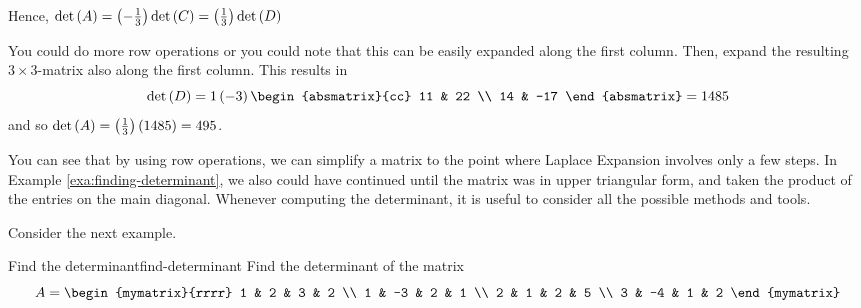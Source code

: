 \begin{solution}
Hence, $\det \left(A\right) = \left(-\frac{1}{3}\right) \det \left(C\right) = \left(\frac{1}{3}\right) \det \left(D\right)$ 

You could do more row operations or you could note that this can be easily
expanded along the first column. Then, expand the resulting $3 \times 3$-matrix
also along the first column. This results in 
\begin{equation*}
\det \tup{D} =1\tup{-3} \begin{absmatrix}{cc}
11 & 22 \\
14 & -17
\end{absmatrix}= 1485
\end{equation*}
and so  $\det \left(A\right) =\left(\frac{1}{3}\right) \left(1485\right)
=495$.
\end{solution} 

You can see that by using row operations, we can simplify a matrix
to the point where Laplace Expansion involves only a few steps. In Example
\ref{exa:finding-determinant}, we also could have continued until the matrix was in 
upper triangular form, and taken the product of the entries on the main diagonal. Whenever 
computing the determinant, it is useful to consider all the possible methods and tools.

Consider the next example.

\begin{example}{Find the determinant}{find-determinant}
Find the determinant of the matrix
\begin{equation*}
A = \begin{mymatrix}{rrrr}
1 & 2 & 3 & 2 \\
1 & -3 & 2 & 1 \\
2 & 1 & 2 & 5 \\
3 & -4 & 1 & 2
\end{mymatrix}
\end{equation*}
\end{example}

